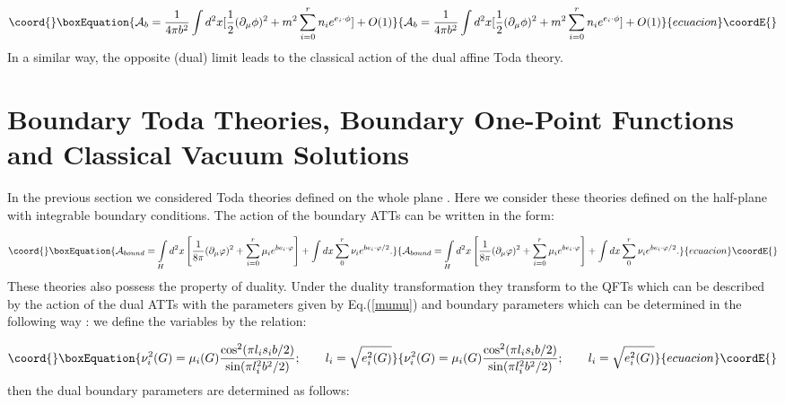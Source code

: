 \documentclass[a4paper,12pt,titlepage,final]{article}
\begin{document}
\begin{equation}\coord{}\boxEquation{
\mathcal{A}_{b}=\frac{1}{4\pi b^{2}}\int d^{2}x[\frac{1}{2}(\partial _{\mu
}\phi )^{2}+m^{2}\sum_{i=0}^{r}n_{i}e^{e_{i}\cdot \phi }]+O(1)  \label{ACL}
}{
\mathcal{A}_{b}=\frac{1}{4\pi b^{2}}\int d^{2}x[\frac{1}{2}(\partial _{\mu
}\phi )^{2}+m^{2}\sum_{i=0}^{r}n_{i}e^{e_{i}\cdot \phi }]+O(1)  }{ecuacion}\coordE{}\end{equation}
In a similar way, the opposite (dual) limit \coordHE{} leads to the classical action of the dual affine Toda theory.

\section{Boundary Toda Theories, Boundary One-Point Functions and Classical
Vacuum Solutions}

In the previous section we considered Toda theories defined on the whole
plane \coordHE{}. Here we consider these theories defined
on the half-plane \coordHE{} with integrable boundary conditions.
The action of the boundary
ATTs can be written in the form:

\begin{equation}\coord{}\boxEquation{
\mathcal{A}_{bound}=\int\limits_{H}d^{2}x\left[ \frac{1}{8\pi }(\partial
_{\mu }\varphi )^{2}+\sum_{i=0}^{r}\mu _{i}e^{be_{i}\cdot \varphi }\right]
+\int dx\sum\limits_{0}^{r}\nu _{i}e^{be_{i}\cdot \varphi /2}.  \label{atb}
}{
\mathcal{A}_{bound}=\int\limits_{H}d^{2}x\left[ \frac{1}{8\pi }(\partial
_{\mu }\varphi )^{2}+\sum_{i=0}^{r}\mu _{i}e^{be_{i}\cdot \varphi }\right]
+\int dx\sum\limits_{0}^{r}\nu _{i}e^{be_{i}\cdot \varphi /2}.  }{ecuacion}\coordE{}\end{equation}
These theories also possess the property of duality. Under the duality
transformation \coordHE{} they transform to the QFTs which
can be described by the action of the dual ATTs with the parameters \coordHE{} given by Eq.(\ref{mumu}) and boundary parameters \coordHE{} which can be determined in the following way \cite{FZZA}:
we define the variables \coordHE{} by the relation:

\begin{equation}\coord{}\boxEquation{
\nu _{i}^{2}(G)=\mu _{i}(G)\frac{\cos ^{2}(\pi l_{i}s_{i}b/2)}{\sin (\pi
l_{i}^{2}b^{2}/2)};\qquad l_{i}=\sqrt{e_{i}^{2}(G)}  \label{nB}
}{
\nu _{i}^{2}(G)=\mu _{i}(G)\frac{\cos ^{2}(\pi l_{i}s_{i}b/2)}{\sin (\pi
l_{i}^{2}b^{2}/2)};\qquad l_{i}=\sqrt{e_{i}^{2}(G)}  }{ecuacion}\coordE{}\end{equation}
then the dual boundary parameters are determined as follows:
\end{document}
